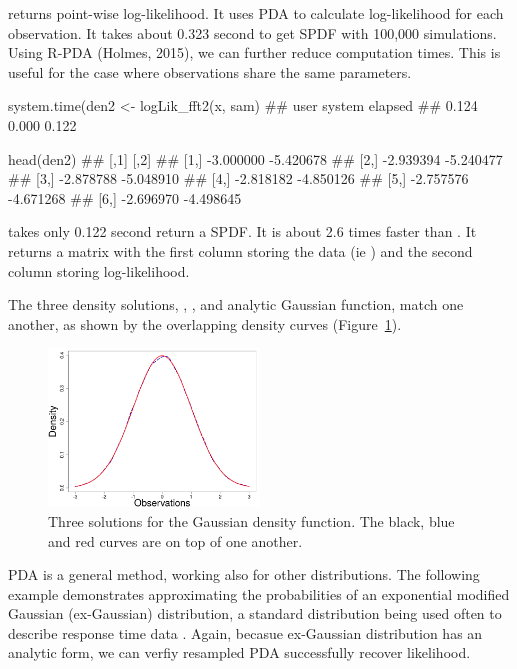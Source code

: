 \documentclass[shortnames,nojss,article]{jss}
\begin{document}
 returns point-wise log-likelihood. It uses PDA to calculate
log-likelihood for each observation.  It takes
about 0.323 second to get SPDF with 100,000 simulations. Using R-PDA
(Holmes, 2015), we can further reduce computation times. This is useful for the
case where observations share the same parameters.

%
\begin{Code}
system.time(den2 <- logLik_fft2(x, sam)
##  user  system elapsed
## 0.124   0.000   0.122

head(den2)
##           [,1]      [,2]
## [1,] -3.000000 -5.420678
## [2,] -2.939394 -5.240477
## [3,] -2.878788 -5.048910
## [4,] -2.818182 -4.850126
## [5,] -2.757576 -4.671268
## [6,] -2.696970 -4.498645
\end{Code}
%

 takes only 0.122 second return a SPDF.  It is about
2.6 times faster than .  It returns a matrix with the
first column storing the data (ie ) and the second column storing
log-likelihood.

The three density solutions,  , , and
analytic Gaussian function, match one another, as shown by the overlapping
density curves (Figure~\ref{fig:gaussian}).

\begin{figure}[htbp]
\begin{center}
    \includegraphics[width=0.5\textwidth]{figs/gaussian}
      \caption{Three solutions for the Gaussian density function. The black,
      blue and red curves are on top of one another.}
      \label{fig:gaussian}
\end{center}
\end{figure}

PDA is a general method, working also for other distributions. The
following example demonstrates approximating the probabilities of an exponential
modified Gaussian (ex-Gaussian) distribution, a standard distribution being
used often to describe response time data \citep{dawson_fitting_1988}. Again, becasue
ex-Gaussian distribution has an analytic form, we can verfiy resampled PDA
successfully recover likelihood.
\end{document}
